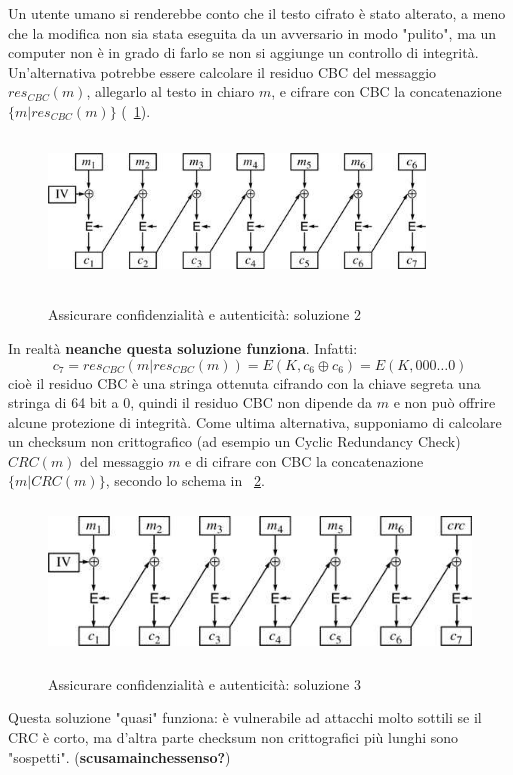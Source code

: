 \newline \newline
Un utente umano si renderebbe conto che il testo cifrato è stato alterato, a meno che la modifica non sia stata eseguita da un avversario in modo "pulito", ma un computer non è in grado di farlo se non si aggiunge un controllo di integrità.
\newline \newline
Un'alternativa potrebbe essere calcolare il residuo CBC del messaggio $res_{CBC}(m)$, allegarlo al testo in chiaro $m$, e cifrare con CBC la concatenazione $\{ m|res_{CBC}(m) \}$ (\figurename ~\ref{fig:residuo_CBC_2}).
\begin{figure}[htbp]
	\centering%
	\subfigure%
	{\includegraphics[height=4cm, width=10cm, keepaspectratio]{Immagini/modalita_operative/residuo_CBC_2.png}}
	\caption{Assicurare confidenzialità e autenticità: soluzione 2 \label{fig:residuo_CBC_2}} 	
\end{figure}
In realtà \textbf{neanche questa soluzione funziona}. Infatti: 
\begin{equation}
c_{7} = res_{CBC}(m|res_{CBC}(m)) = E(K, c_{6} \oplus c_{6}) = E(K, 000 … 0)
\end{equation}
cioè il residuo CBC è una stringa ottenuta cifrando con la chiave segreta una stringa di 64 bit a 0, quindi il residuo CBC non dipende da $m$ e non può offrire alcune protezione di integrità.
\newline \newline
Come ultima alternativa, supponiamo di calcolare un checksum non crittografico (ad esempio un Cyclic Redundancy Check) $CRC(m)$ del messaggio $m$ e di cifrare con CBC la concatenazione $\{ m| CRC(m) \}$, secondo lo schema in \figurename~\ref{fig:residuo_CBC_3}.
\begin{figure}[htbp]
	\centering%
	\subfigure%
	{\includegraphics[height=4cm, width=12cm, keepaspectratio]{Immagini/modalita_operative/residuo_CBC_3.png}}
	\caption{Assicurare confidenzialità e autenticità: soluzione 3 \label{fig:residuo_CBC_3}} 	
\end{figure}
Questa soluzione "quasi" funziona: è vulnerabile ad attacchi molto sottili se il CRC è corto, ma d'altra parte checksum non crittografici più lunghi sono "sospetti". (\textbf{scusamainchessenso?}) 
